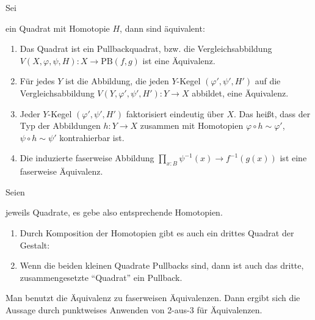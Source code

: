 \begin{lemma}
  Sei
  \begin{center}
  \end{center}
  ein Quadrat mit Homotopie $H$, dann sind äquivalent:
  \begin{enumerate}
  \item Das Quadrat ist ein Pullbackquadrat, bzw. die Vergleichsabbildung $V(X,\varphi,\psi,H):X\to\mathrm{PB}(f,g)$ ist eine Äquivalenz.
  \item Für jedes $Y$ ist die Abbildung, die jeden $Y$-Kegel $(\varphi',\psi',H')$ auf die Vergleichsabbildung $V(Y,\varphi',\psi',H'):Y\to X$ abbildet, eine Äquivalenz.
  \item Jeder $Y$-Kegel $(\varphi',\psi',H')$ faktorisiert eindeutig über $X$. Das heißt, dass der Typ der Abbildungen $h:Y\to X$ zusammen mit Homotopien $\varphi\circ h\sim\varphi'$, $\psi\circ h\sim\psi'$ kontrahierbar ist.
  \item Die induzierte faserweise Abbildung $\prod_{x:B}\psi^{-1}(x)\to f^{-1}(g(x))$ ist eine faserweise Äquivalenz.
  \end{enumerate}
\end{lemma}

\begin{theorem}
  Seien
  \begin{center}
  \end{center}
  jeweils Quadrate, es gebe also entsprechende Homotopien.
  \begin{enumerate}
  \item  Durch Komposition der Homotopien gibt es auch ein drittes Quadrat der Gestalt:
    \begin{center}
    \end{center}
  \item Wenn die beiden kleinen Quadrate Pullbacks sind, dann ist auch das dritte, zusammengesetzte ``Quadrat'' ein Pullback.
  \end{enumerate}
\end{theorem}
\begin{beweis}
  Man benutzt die Äquivalenz zu faserweisen Äquivalenzen. Dann ergibt sich die Aussage durch punktweises Anwenden von 2-aus-3 für Äquivalenzen.
\end{beweis}

